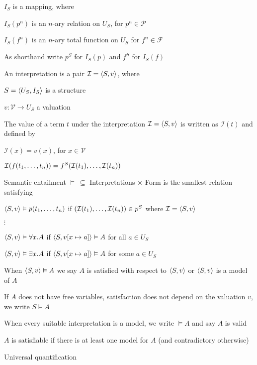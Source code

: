 			\item $I_S$ is a mapping, where
			\enumstart
				\item $I_S(p^n)$ is an $n$-ary relation on $U_S$, for $p^n \in \mathcal{P}$
				\item $I_S(f^n)$ is an $n$-ary total function on $U_S$ for $f^n \in \mathcal{F}$
				\item As shorthand write $p^S$ for $I_S(p)$ and $f^S$ for $I_S(f)$
			\enumend
		\enumend
		\item An interpretation is a pair $\mathcal{I} = \langle S,v \rangle$, where
		\enumstart
			\item $S = \langle U_S, I_S \rangle$ is a structure
			\item $v: \mathcal{V} \rightarrow U_S$ a valuation
		\enumend
		\item The value of a term $t$ under the interpretation $\mathcal{I} = \langle S, v \rangle$ is written as $\mathcal{I}(t)$ and defined by
		\enumstart
			\item $\mathcal{I}(x) = v(x)$, for $x \in \mathcal{V}$
			\item $\mathcal{I}(f(t_1, \mathellipsis, t_n)) = f^S(\mathcal{I}(t_1), \mathellipsis, \mathcal{I}(t_n))$
		\enumend
		\item Semantic entailment $\vDash \ \subseteq$ Interpretations $\times$ Form is the smallest relation satisfying
		\enumstart
			\item $\langle S, v \rangle \vDash p(t_1, \mathellipsis, t_n)$ if $(\mathcal{I}(t_1), \mathellipsis, \mathcal{I}(t_n)) \in p^S$ where $\mathcal{I} = \langle S, v \rangle$
			\item $\vdots$
			\item $\langle S, v \rangle \vDash \forall x.A$ if $\langle S, v[x \mapsto a] \rangle \vDash A$ for all $a \in U_S$
			\item $\langle S, v \rangle \vDash \exists x.A$ if $\langle S, v[x \mapsto a] \rangle \vDash A$ for some $a \in U_S$
		\enumend
		\item When $\langle S, v \rangle \vDash A$ we say $A$ is satisfied with respect to $\langle S, v \rangle$ or $\langle S, v \rangle$ is a model of $A$
		\item If $A$ does not have free variables, satisfaction does not depend on the valuation $v$, we write $S \vDash A$
		\item When every suitable interpretation is a model, we write $\vDash A$ and say $A$ is valid
		\item $A$ is satisfiable if there is at least one model for $A$ (and contradictory otherwise)
		\item Universal quantification
